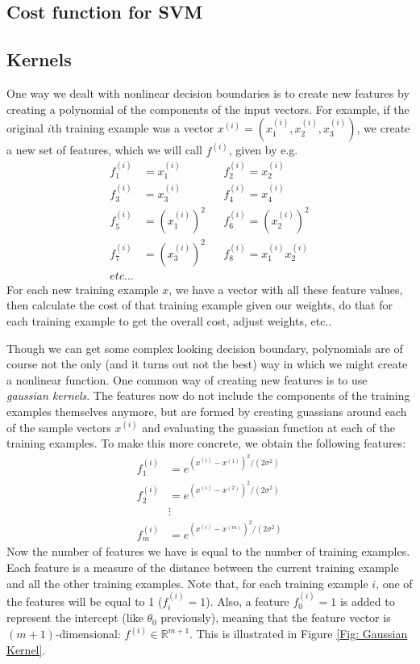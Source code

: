 \documentclass[a4paper, 10pt,hidelinks]{article}
\newcommand{\ind}[1]{^{(#1)}}
\begin{document}
\subsection{Cost function for SVM}

\subsection{Kernels}

One way we dealt with nonlinear decision boundaries is to create new features by creating a polynomial of the components of the input vectors. For example, if the original $i$th training example was a vector $x\ind{i} = (x\ind{i}_1, x\ind{i}_2, x\ind{i}_3)$, we create a new set of features, which we will call $f\ind{i}$, given by e.g. 
\begin{align}
f\ind{i}_1 &= x\ind{i}_1  && f\ind{i}_2 = x\ind{i}_2 \nonumber \\
f\ind{i}_3 &= x\ind{i}_3  && f\ind{i}_4 = x\ind{i}_4 \nonumber \\
f\ind{i}_5 &= (x\ind{i}_1)^2  && f\ind{i}_6 = (x\ind{i}_2)^2 \nonumber \\
f\ind{i}_7 &= (x\ind{i}_3)^2  &&f\ind{i}_8 = x\ind{i}_1 x\ind{i}_2 \nonumber \\
etc...
\end{align}
For each new training example $x$, we have a vector with all these feature values, then calculate the cost of that training example given our weights, do that for each training example to get the overall cost, adjust weights, etc.. 

Though we can get some complex looking decision boundary, polynomials are of course not the only (and it turns out not the best) way in which we might create a nonlinear function. One common way of creating new features is to use \emph{gaussian kernels}. The features now do not include the components of the training examples themselves anymore, but are formed by creating guassians around each of the sample vectors $x^{(i)}$ and evaluating the guassian function at each of the training examples. To make this more concrete, we obtain the following features:
\begin{align}
f_1\ind{i} &= e^{(x\ind{i} - x\ind{1})^2/(2 \sigma^2)} \nonumber \\
f_2\ind{i} &= e^{(x\ind{i} - x\ind{2})^2/(2 \sigma^2)} \nonumber \\
&\vdots \nonumber \\
f_m\ind{i} &= e^{(x\ind{i} - x\ind{m})^2/(2 \sigma^2)} 
\end{align}
Now the number of features we have is equal to the number of training examples. Each feature is a measure of the distance between the current training example and all the other training examples. Note that, for each training example $i$, one of the features will be equal to 1 ($f_i\ind{i} = 1$). Also, a feature $f_0\ind{i} = 1$ is added to represent the intercept (like $\theta_0$ previously), meaning that the feature vector is $(m+1)$-dimensional: $f\ind{i} \in \mathbb{R}^{m+1}$.  This is illustrated in Figure \ref{Fig: Gaussian Kernel}.
\end{document}
